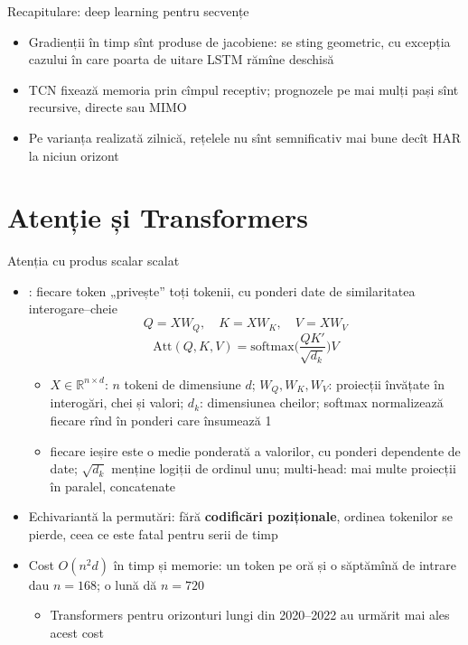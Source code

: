 \begin{frame}{Recapitulare: deep learning pentru secvențe}
\itemsize{\small}
\begin{itemize}
    \item Gradienții în timp sînt produse de jacobiene: se sting geometric, cu excepția cazului în care poarta de uitare LSTM rămîne deschisă
    \item TCN fixează memoria prin cîmpul receptiv; prognozele pe mai mulți pași sînt recursive, directe sau MIMO
    \item Pe varianța realizată zilnică, rețelele nu sînt semnificativ mai bune decît HAR la niciun orizont
\end{itemize}
\end{frame}


\section{Atenție și Transformers}

\begin{frame}{Atenția cu produs scalar scalat}
\itemsize{\small}
\begin{itemize}
    \item {}: fiecare token „privește” toți tokenii, cu ponderi date de similaritatea interogare--cheie
    \[ Q = XW_Q, \quad K = XW_K, \quad V = XW_V \]
    \[ \mathrm{Att}(Q, K, V) = \mathrm{softmax}\Big(\frac{QK'}{\sqrt{d_k}}\Big)V \]
    \begin{itemize}
        \item $X \in \mathbb R^{n\times d}$: $n$ tokeni de dimensiune $d$; $W_Q, W_K, W_V$: proiecții învățate în interogări, chei și valori; $d_k$: dimensiunea cheilor; softmax normalizează fiecare rînd în ponderi care însumează 1
        \item fiecare ieșire este o medie ponderată a valorilor, cu ponderi dependente de date; $\sqrt{d_k}$ menține logiții de ordinul unu; multi-head: mai multe proiecții în paralel, concatenate
    \end{itemize}
    \item Echivariantă la permutări: fără \textbf{codificări poziționale}, ordinea tokenilor se pierde, ceea ce este fatal pentru serii de timp
    \item Cost $O(n^2 d)$ în timp și memorie: un token pe oră și o săptămînă de intrare dau $n = 168$; o lună dă $n = 720$
    \begin{itemize}
        \item Transformers pentru orizonturi lungi din 2020--2022 au urmărit mai ales acest cost
    \end{itemize}
\end{itemize}
\end{frame}

